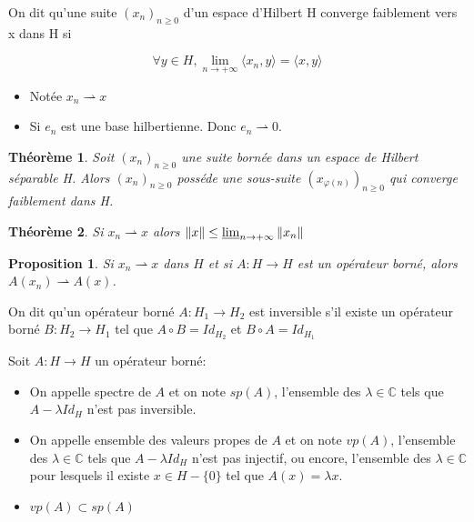 \documentclass[10pt,a4paper,oneside]{article}
\newtheorem{theoreme}{Théorème}
\newtheorem{proposition}{Proposition}
\newenvironment{definition}[1][Definition]{\begin{trivlist}
\item[\hskip \labelsep {\bfseries #1}]}{\end{trivlist}}
\begin{document}
\begin{definition}
On dit qu'une suite $(x_n)_{n\geq0}$ d'un espace d'Hilbert H converge faiblement vers x dans H si

\[ \forall y \in H, \lim\limits_{n\rightarrow+\infty}\langle x_n,y \rangle = \langle x,y \rangle \]

\begin{itemize}

\item
Notée $x_n \rightharpoonup x$

\item
Si $e_n$ est une base hilbertienne. Donc $e_n \rightharpoonup 0$.

\end{itemize}

\end{definition}


\begin{theoreme}
Soit $(x_n)_{n\geq0}$ une suite bornée dans un espace de Hilbert séparable H. Alors $(x_n)_{n\geq0}$ posséde une sous-suite $(x_{\varphi(n)})_{n\geq0}$ qui converge faiblement dans H.
\end{theoreme}


\begin{theoreme}
Si $x_n \rightharpoonup x$ alors $\| x \| \leq \varliminf_{n \to +\infty} \| x_n \|$
\end{theoreme}


\begin{proposition}
Si $x_n \rightharpoonup x$ dans $H$ et si $A: H \rightarrow H$ est un opérateur borné, alors $A(x_n) \rightharpoonup A(x)$.
\end{proposition}


\begin{definition}
On dit qu'un opérateur borné $A: H_{1} \rightarrow H_{2}$ est inversible s'il existe un opérateur borné $B: H_{2} \rightarrow H_{1}$ tel que $A \circ B = Id_{H_{2}}$ et $B \circ A = Id_{H_{1}}$
\end{definition}


\begin{definition}
Soit $A: H \rightarrow H$ un opérateur borné:

\begin{itemize}

\item
On appelle spectre de $A$  et on note $sp(A)$, l'ensemble des $\lambda \in \mathbb{C}$ tels que $A - \lambda Id_{H}$ n'est pas inversible.

\item
On appelle ensemble des valeurs propes de $A$ et on note $vp(A)$, l'ensemble des $\lambda \in \mathbb{C}$ tels que $A - \lambda Id_{H}$ n'est pas injectif, ou encore, l'ensemble des $\lambda \in \mathbb{C}$ pour lesquels il existe $x \in H - \{0\}$ tel que $A(x) = \lambda x$.

\item
$vp(A) \subset sp(A)$

\end{itemize}

\end{definition}
\end{document}
